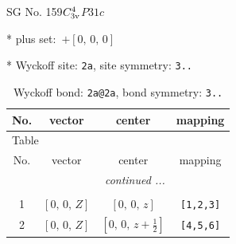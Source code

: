 \documentclass[fleqn,8pt]{jsarticle}
\begin{document}
\setcounter{MaxMatrixCols}{32}

\renewcommand{\tablename}{Table~}
\renewcommand{\figurename}{Figure~}
\begin{center}
\LARGE
SG No. 159\quad$C_{\rm 3v}^{4}$\quad$P31c$\quad[ trigonal ]
\end{center}

* plus set:\,\,\,$+\left[ 0,\, 0,\, 0 \right]$


* Wyckoff site: {\tt 2a}, site symmetry: {\tt 3..}
\renewcommand{\arraystretch}{1.2}
\begin{longtable}{cccc}
\caption{Wyckoff bond: {\tt 2a@2a}, bond symmetry: {\tt 3..}}
 \\
 \hline \hline
No. & vector & center & mapping \\ \hline \endfirsthead

\multicolumn{3}{l}{\tablename\ \thetable{}} \\
 \hline \hline
No. & vector & center & mapping \\ \hline \endhead

 \hline \hline
\multicolumn{3}{r}{\footnotesize\it continued ...} \\ \endfoot

 \hline \hline
\multicolumn{3}{r}{} \\ \endlastfoot

1 & $\left[ 0,\, 0,\, Z \right]$ & $\left[ 0,\, 0,\, z \right]$ & {\tt [1,2,3]} \\ \hline
2 & $\left[ 0,\, 0,\, Z \right]$ & $\left[ 0,\, 0,\, z + \frac{1}{2} \right]$ & {\tt [4,5,6]} \\
\end{longtable}
\renewcommand{\arraystretch}{1.2}
\end{document}
